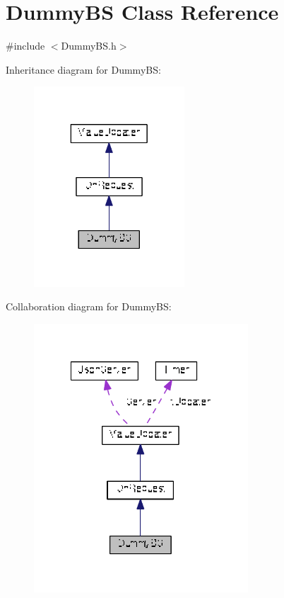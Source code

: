 \hypertarget{class_dummy_b_s}{\section{Dummy\+B\+S Class Reference}
\label{class_dummy_b_s}
}


{\ttfamily \#include $<$Dummy\+B\+S.\+h$>$}



Inheritance diagram for Dummy\+B\+S\+:\nopagebreak
\begin{figure}[H]
\begin{center}
\leavevmode
\includegraphics[width=160pt]{class_dummy_b_s__inherit__graph}
\end{center}
\end{figure}


Collaboration diagram for Dummy\+B\+S\+:\nopagebreak
\begin{figure}[H]
\begin{center}
\leavevmode
\includegraphics[width=227pt]{class_dummy_b_s__coll__graph}
\end{center}
\end{figure}
